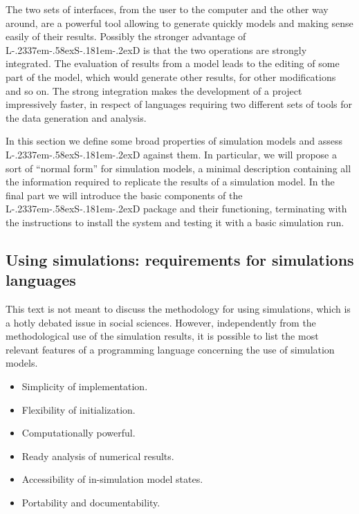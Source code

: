 \documentclass [11pt,a4paper] {book}
\def\LsD{{L\kern-.2337em\lower-.58ex\hbox{S}\kern-.181em\lower-.2ex\hbox{D}}\xspace}
\begin{document}
The two sets of interfaces, from the user to the computer and the other way around, are a powerful tool allowing to generate quickly models and making sense easily of their results. Possibly the stronger advantage of \LsD is that the two operations are strongly integrated. The evaluation of results from a model leads to the editing of some part of the model, which would generate other results, for other modifications and so on. The strong integration makes the development of a project impressively faster, in respect of languages requiring two different sets of tools for the data generation and analysis.

In this section we define some broad properties of simulation models and assess \LsD against them. In particular, we will propose a sort of ``normal form'' for simulation models, a minimal description containing all the information required to replicate the results of a simulation model. In the final part we will introduce the basic components of the \LsD package and their functioning, terminating with the instructions to install the system and testing it with a basic simulation run.


\subsection{Using simulations: requirements for simulations languages}
This text is not meant to discuss the methodology for using simulations, which is a hotly debated issue in social sciences. However, independently from the methodological use of the simulation results, it is possible to list the most relevant features of a programming language concerning the use of simulation models.

\begin{itemize}
	\item Simplicity of implementation. 
	\item Flexibility of initialization.
	\item Computationally powerful.
	\item Ready analysis of numerical results.
	\item Accessibility of in-simulation model states.
	\item Portability and documentability.
\end{itemize}
\end{document}
